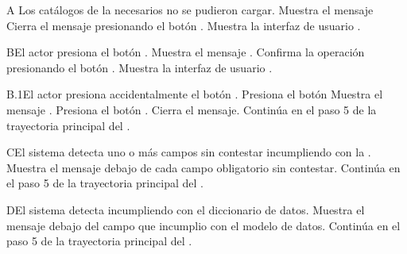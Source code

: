     \begin{UCtrayectoriaA}{A}{ Los catálogos de la  necesarios no se pudieron cargar.}
    	\UCpaso Muestra el mensaje 
    	\UCpaso[\UCactor] Cierra el mensaje presionando el botón .
    	\UCpaso Muestra la interfaz de usuario .
    \end{UCtrayectoriaA}

    \begin{UCtrayectoriaA}{B}{El actor presiona el botón .}
    	\UCpaso Muestra el mensaje .
    	\UCpaso[\UCactor] Confirma la operación presionando el botón .
    	\UCpaso Muestra la interfaz de usuario .
    \end{UCtrayectoriaA}

    \begin{UCtrayectoriaA}{B.1}{El actor presiona accidentalmente el botón .}
    	\UCpaso[\UCactor] Presiona el botón 
    	\UCpaso Muestra el mensaje .
    	\UCpaso[\UCactor] Presiona el botón .
    	\UCpaso Cierra el mensaje.
    	\UCpaso Continúa en el paso 5 de la trayectoria principal del .
    \end{UCtrayectoriaA}

    \begin{UCtrayectoriaA}{C}{El sistema detecta uno o más campos sin contestar incumpliendo con la .}
    	\UCpaso Muestra el mensaje debajo de cada campo obligatorio sin contestar.
    	\UCpaso Continúa en el paso 5 de la trayectoria principal del .
    \end{UCtrayectoriaA}

    \begin{UCtrayectoriaA}{D}{El sistema detecta incumpliendo con el diccionario de datos.}
    	\UCpaso Muestra el mensaje  debajo del campo que incumplio con el modelo de datos.
    	\UCpaso Continúa en el paso 5 de la trayectoria principal del .
    \end{UCtrayectoriaA}


